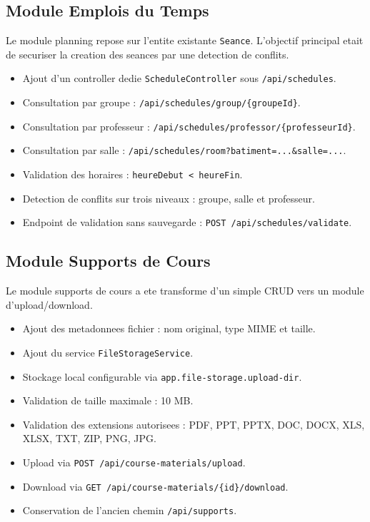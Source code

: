 \documentclass[12pt,a4paper]{report}
\begin{document}
\subsection{Module Emplois du Temps}

Le module planning repose sur l'entite existante \texttt{Seance}. L'objectif principal etait de securiser la creation des seances par une detection de conflits.

\begin{itemize}[itemsep=0.3em]
    \item Ajout d'un controller dedie \texttt{ScheduleController} sous \texttt{/api/schedules}.
    \item Consultation par groupe : \texttt{/api/schedules/group/\{groupeId\}}.
    \item Consultation par professeur : \texttt{/api/schedules/professor/\{professeurId\}}.
    \item Consultation par salle : \texttt{/api/schedules/room?batiment=...&salle=...}.
    \item Validation des horaires : \texttt{heureDebut < heureFin}.
    \item Detection de conflits sur trois niveaux : groupe, salle et professeur.
    \item Endpoint de validation sans sauvegarde : \texttt{POST /api/schedules/validate}.
\end{itemize}

\subsection{Module Supports de Cours}

Le module supports de cours a ete transforme d'un simple CRUD vers un module d'upload/download.

\begin{itemize}[itemsep=0.3em]
    \item Ajout des metadonnees fichier : nom original, type MIME et taille.
    \item Ajout du service \texttt{FileStorageService}.
    \item Stockage local configurable via \texttt{app.file-storage.upload-dir}.
    \item Validation de taille maximale : 10 MB.
    \item Validation des extensions autorisees : PDF, PPT, PPTX, DOC, DOCX, XLS, XLSX, TXT, ZIP, PNG, JPG.
    \item Upload via \texttt{POST /api/course-materials/upload}.
    \item Download via \texttt{GET /api/course-materials/\{id\}/download}.
    \item Conservation de l'ancien chemin \texttt{/api/supports}.
\end{itemize}
\end{document}
